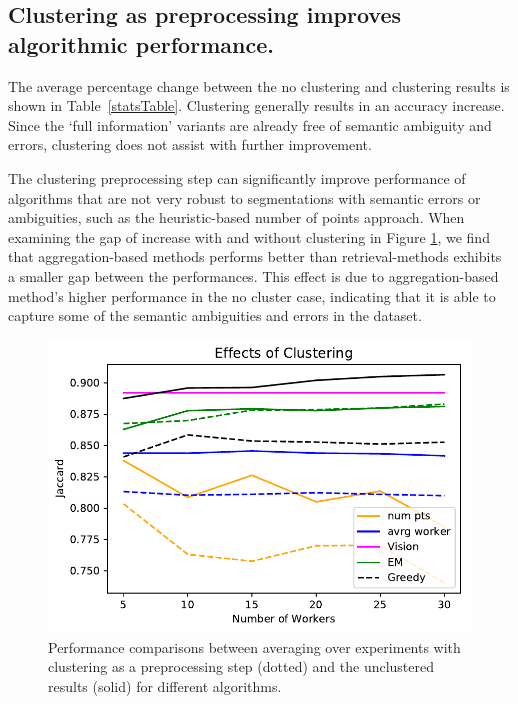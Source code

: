 \subsection*{Clustering as preprocessing improves algorithmic performance.}
\par \noindent The average percentage change between the no clustering and clustering results is shown in Table~\ref{statsTable}. Clustering generally results in an accuracy increase. Since the `full information' variants are already free of semantic ambiguity and errors, clustering does not assist with further improvement. %
\par The clustering preprocessing step can significantly improve performance of algorithms that are not very robust to segmentations with semantic errors or ambiguities, such as the heuristic-based number of points approach. When examining the gap of increase with and without clustering in Figure \ref{cluster_effect}, we find that aggregation-based methods performs better than retrieval-methods exhibits a smaller gap between the performances. This effect is due to aggregation-based method's higher performance in the no cluster case, indicating that it is able to capture some of the semantic ambiguities and errors in the dataset.
\begin{figure}[ht!]
      \centering
      \includegraphics[width=\linewidth]{plots/Effects_of_clustering.pdf}
      \caption{Performance comparisons between averaging over experiments with clustering as a preprocessing step (dotted) and the unclustered results (solid) for different algorithms.}
      \label{cluster_effect}
\end{figure}
